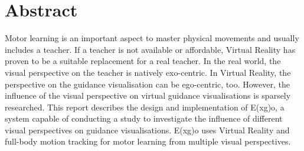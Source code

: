 \chapter*{Abstract}

Motor learning is an important aspect to master physical movements and usually includes a teacher. If a teacher is not available or affordable, Virtual Reality has proven to be a suitable replacement for a real teacher. In the real world, the visual perspective on the teacher is natively exo-centric. In Virtual Reality, the perspective on the guidance visualisation can be ego-centric, too. 
However, the influence of the visual perspective on virtual guidance visualisations is sparsely researched.
This report describes the design and implementation of E(x\textbar g)o, a system capable of conducting a study to investigate the influence of different visual perspectives on guidance visualisations. E(x\textbar g)o uses Virtual Reality and full-body motion tracking for motor learning from multiple visual perspectives.

\thispagestyle{empty}